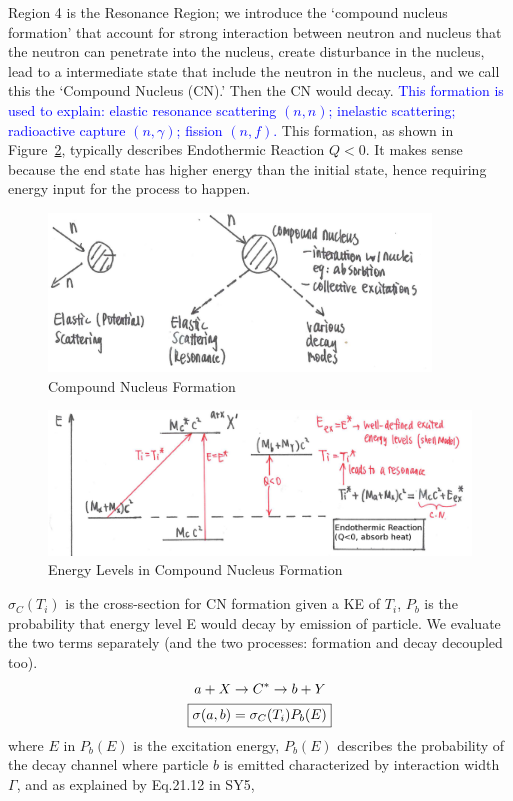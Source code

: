 \documentclass{school-22.101-notes}
\begin{document}
Region 4 is the Resonance Region; we introduce the `compound nucleus formation' that account for strong interaction between neutron and nucleus that the neutron can penetrate into the nucleus, create disturbance in the nucleus, lead to a intermediate state that include the neutron in the nucleus, and we call this the `Compound Nucleus (CN).' Then the CN would decay. \textcolor{blue}{This formation is used to explain: elastic resonance scattering $(n,n)$; inelastic scattering; radioactive capture $(n,\gamma)$; fission $(n,f)$.} This formation, as shown in Figure~\ref{compound-formation-energy}, typically describes Endothermic Reaction $Q < 0$. It makes sense because the end state has higher energy than the initial state, hence requiring energy input for the process to happen.  
\begin{figure}
   \centering
   \includegraphics[width=4in]{images/ni/compound-formation.png}
   \caption{Compound Nucleus Formation\label{compound-formation}}
\end{figure}
\begin{figure}
   \centering
   \includegraphics[width=6in]{images/ni/compound-formation-energy.png}
   \caption{Energy Levels in Compound Nucleus Formation\label{compound-formation-energy}}
\end{figure}

$\sigma_C (T_i)$ is the cross-section for CN formation given a KE of $T_i$, $P_b$ is the probability that energy level E would decay by emission of particle. We evaluate the two terms separately (and the two processes: formation and decay decoupled too). 
\begin{align}
a + X  &\to C^* \to b + Y \\
\Aboxed{ \sigma (a,b) &= \sigma_C (T_i) P_b (E) }
\end{align}
where $E$ in $P_b(E)$ is the excitation energy, $P_b(E)$ describes the probability of the decay channel where particle $b$ is emitted characterized by interaction width $\Gamma$, and as explained by Eq.21.12 in SY5, 
\end{document}

